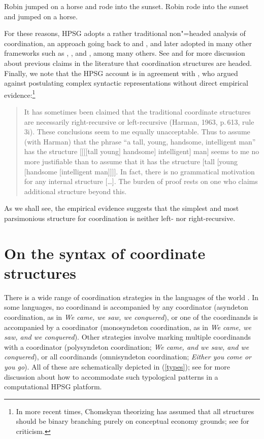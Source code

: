 \eal
\label{ex-robin-jumped-on-a-horse}
\ex Robin jumped on a horse and rode into the sunset.
\ex Robin rode into the sunset and jumped on a horse.
\zl

For these reasons, HPSG adopts a rather traditional non"=headed analysis of coordination, an approach  going back
to \citet[195]{bloom} and  \citet[Section~4.2]{ross67}, and later adopted in many other frameworks
such as \citet[Section~3.1]{pesetsky}, \citet[]{gazdarc}, and \citet[1275]{rodney}, among many others. 
See \citet{borsley94,Borsley2005a}
and 
\citet[Chapter~2]{chavesthesis} for more discussion about previous claims in the literature that coordination structures are headed.
Finally, we note that the HPSG account is in agreement with \citet[196]{chom65}, who argued against postulating complex syntactic representations without direct empirical evidence:\footnote{In more recent times, Chomskyan theorizing has assumed that all structures should be binary branching purely on conceptual economy grounds; see \citet{Johnson:Lappin:99} for criticism.}

\begin{quote}
It has sometimes been claimed that the traditional coordinate structures are necessarily
right-recursive \citep{Yngve60a-u} or left-recursive (Harman, 1963, p.\,613, rule 3i). These
conclusions seem to me equally unacceptable. Thus to assume (with Harman) that the phrase ``a tall,
young, handsome, intelligent man'' has the structure [[[[tall young] handsome] intelligent] man]
seems to me no more justifiable than to assume that it has the structure [tall [young [handsome
[intelligent man]]]]. In fact, there is no grammatical motivation for any internal structure
[\ldots]. The burden of proof rests on one who claims additional structure beyond
this. \citep[196--197]{chom65} 
\end{quote}

\noindent
As we shall see, the empirical evidence suggests that
the simplest and most parsimonious structure for coordination is neither left- nor right-recursive.


\section{On the syntax of coordinate structures}


There is a wide range of coordination strategies in the languages of the world \citep{haspelmath}. In some languages, no coordinand is accompanied by any coordinator (asyndeton coordination, as in \emph{We came, we saw, we conquered}), or one of the coordinands is accompanied by a coordinator (monosyndeton coordination,  as in \emph{We came, we saw, and we conquered}). Other strategies involve marking multiple coordinands with a coordinator (polysyndeton coordination;
\emph{We came, and we saw, and we conquered}), or all coordinands (omnisyndeton coordination;
\emph{Either you come or you go}).
All of these are schematically depicted in (\ref{types}); see
 \citet{Drellishak:Bender:05} for more discussion about how to accommodate such typological patterns in a computational HPSG platform.

